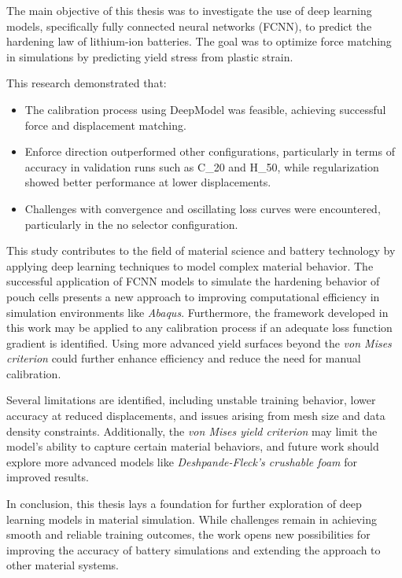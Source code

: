 The main objective of this thesis was to investigate the use of deep learning models, specifically fully connected neural networks (FCNN), to predict the hardening law of lithium-ion batteries. The goal was to optimize force matching in simulations by predicting yield stress from plastic strain.

This research demonstrated that:
\begin{itemize}
    \item The calibration process using DeepModel was feasible, achieving successful force and displacement matching.
    \item Enforce direction outperformed other configurations, particularly in terms of accuracy in validation runs such as {C\_20} and {H\_50}, while  regularization showed better performance at lower displacements.
    \item Challenges with convergence and oscillating loss curves were encountered, particularly in the no selector configuration.
\end{itemize}

This study contributes to the field of material science and battery technology by applying deep learning techniques to model complex material behavior. The successful application of FCNN models to simulate the hardening behavior of pouch cells presents a new approach to improving computational efficiency in simulation environments like \textit{Abaqus}. Furthermore, the framework developed in this work may be applied to any calibration process if an adequate loss function gradient is identified. Using more advanced yield surfaces beyond the \textit{von Mises criterion} could further enhance efficiency and reduce the need for manual calibration.

Several limitations are identified, including unstable training behavior, lower accuracy at reduced displacements, and issues arising from mesh size and data density constraints. Additionally, the \textit{von Mises yield criterion} may limit the model’s ability to capture certain material behaviors, and future work should explore more advanced models like \textit{Deshpande-Fleck’s crushable foam} for improved results.

In conclusion, this thesis lays a foundation for further exploration of deep learning models in material simulation. While challenges remain in achieving smooth and reliable training outcomes, the work opens new possibilities for improving the accuracy of battery simulations and extending the approach to other material systems.

\newpage
